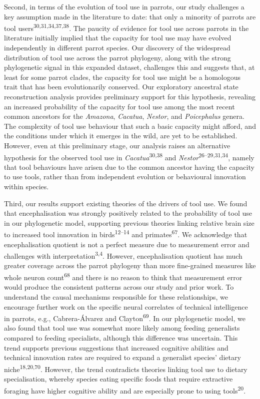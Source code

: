\documentclass[
  man, donotrepeattitle,floatsintext]{apa6}
\begin{document}
Second, in terms of the evolution of tool use in parrots, our study challenges a
key assumption made in the literature to date: that only a minority of parrots
are tool users\textsuperscript{30,31,34,37,38}.
The paucity of evidence for tool use across parrots in the literature initially
implied that the capacity for tool use may have evolved independently in
different parrot species. Our discovery of the widespread distribution of tool
use across the parrot phylogeny, along with the strong phylogenetic signal in
this expanded dataset, challenges this and suggests that, at least for some
parrot clades, the capacity for tool use might be a homologous trait that has
been evolutionarily conserved. Our exploratory ancestral state reconstruction
analysis provides preliminary support for this hypothesis, revealing an
increased probability of the capacity for tool use among the most recent common
ancestors for the \emph{Amazona}, \emph{Cacatua}, \emph{Nestor}, and \emph{Poicephalus} genera. The
complexity of tool use behaviour that such a basic capacity might afford, and
the conditions under which it emerges in the wild, are yet to be established.
However, even at this preliminary stage, our analysis raises an alternative
hypothesis for the observed tool use in \emph{Cacatua}\textsuperscript{30,38}
and \emph{Nestor}\textsuperscript{26--29,31,34}, namely that tool behaviours have arisen due to the
common ancestor having the capacity to use tools, rather than from independent
evolution or behavioural innovation within species.

Third, our results support existing theories of the drivers of tool use. We
found that encephalisation was strongly positively related to the probability of
tool use in our phylogenetic model, supporting previous theories linking
relative brain size to increased tool innovation in birds\textsuperscript{12--14} and primates\textsuperscript{67}. We acknowledge that
encephalisation quotient is not a perfect measure due to measurement error and
challenges with interpretation\textsuperscript{3,4}. However, encephalisation
quotient has much greater coverage across the parrot phylogeny than more
fine-grained measures like whole neuron count\textsuperscript{68} and there is no reason
to think that measurement error would produce the consistent patterns across our
study and prior work. To understand the causal mechanisms responsible for these
relationships, we encourage further work on the specific neural correlates of
technical intelligence in parrots, e.g., Cabrera-Álvarez and Clayton\textsuperscript{69}. In our phylogenetic model, we also found that tool use was
somewhat more likely among feeding generalists compared to feeding specialists,
although this difference was uncertain. This trend supports previous suggestions
that increased cognitive abilities and technical innovation rates are required
to expand a generalist species' dietary niche\textsuperscript{18,20,70}. However, the trend contradicts theories
linking tool use to dietary specialisation, whereby species eating specific
foods that require extractive foraging have higher cognitive ability and are
especially prone to using tools\textsuperscript{20}.
\end{document}
